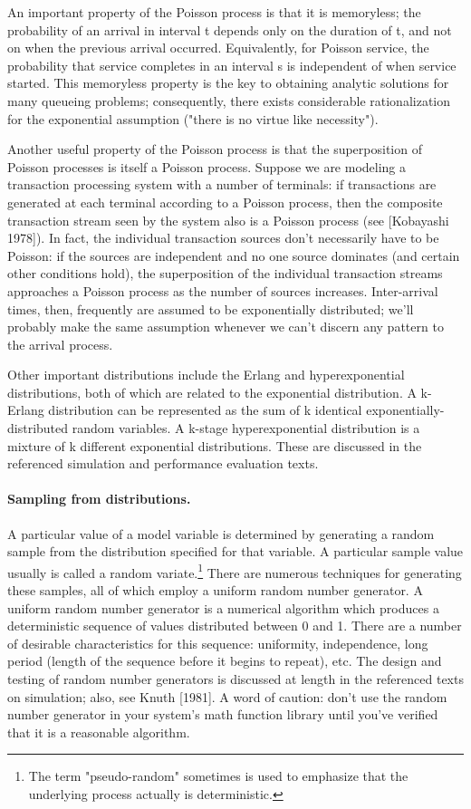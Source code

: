 An important property of the Poisson process is that it is memoryless; the
probability of an arrival in interval t depends only on the duration of t, and
not on when the previous arrival occurred. Equivalently, for Poisson service,
the probability that service completes in an interval s is independent of when
service started. This memoryless property is the key to obtaining analytic
solutions for many queueing problems; consequently, there exists considerable
rationalization for the exponential assumption ("there is no virtue like
necessity").

Another useful property of the Poisson process is that the superposition of
Poisson processes is itself a Poisson process. Suppose we are modeling a
transaction processing system with a number of terminals: if transactions are
generated at each terminal according to a Poisson process, then the composite
transaction stream seen by the system also is a Poisson process (see
[Kobayashi 1978]). In fact, the individual transaction sources don't
necessarily have to be Poisson: if the sources are independent and no one
source dominates (and certain other conditions hold), the superposition of the
individual transaction streams approaches a Poisson process as the number of
sources increases. Inter-arrival times, then, frequently are assumed to be
exponentially distributed; we'll probably make the same assumption whenever we
can't discern any pattern to the arrival process.

Other important distributions include the Erlang and hyperexponential
distributions, both of which are related to the exponential distribution. A
k-Erlang distribution can be represented as the sum of k identical
exponentially-distributed random variables. A k-stage hyperexponential
distribution is a mixture of k different exponential distributions. These are
discussed in the referenced simulation and performance evaluation texts.

\paragraph{Sampling from distributions.}
A particular value of a model variable is determined by generating a random
sample from the distribution specified for that variable. A particular sample
value usually is called a random variate.\footnote{The term "pseudo-random"
sometimes is used to emphasize that the underlying process actually is
deterministic.} There are numerous techniques for generating these samples, all
of which employ a uniform random number generator. A uniform random number
generator is a numerical algorithm which produces a deterministic sequence of
values distributed between 0 and 1. There are a number of desirable
characteristics for this sequence: uniformity, independence, long period
(length of the sequence before it begins to repeat), etc. The design and
testing of random number generators is discussed at length in the referenced
texts on simulation; also, see Knuth [1981]. A word of caution: don't use the
random number generator in your system's math function library until you've
verified that it is a reasonable algorithm.

